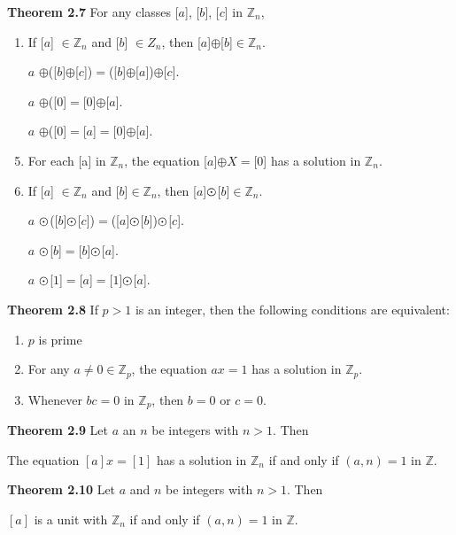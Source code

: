 \documentclass[12pt]{article}
\newcommand{\Z}{\mathbb{Z}}
\begin{document}
\noindent
\textbf{Theorem 2.7} For any classes [$a$], [$b$], [$c$] in $\Z_n$,
\begin{enumerate}
\item If [$a$] $\in \Z_n$ and [$b$] $\in Z_n$, then [$a$]$\oplus$[$b$]$\in \Z_n$. \\
\item [$a$]$\oplus$([$b$]$\oplus$[$c$])$=$([$b$]$\oplus$[$a$])$\oplus$[$c$]. \\
\item [$a$]$\oplus$([$0$]$=$[$0$]$\oplus$[$a$]. \\
\item [$a$]$\oplus$([$0$]$=$[$a$]$=$[$0$]$\oplus$[$a$]. \\
\item For each $[$a$]$ in $\Z_n$, the equation [$a$]$\oplus X=$[$0$] has a solution in $\Z_n$. \\
\item If [$a$] $\in \Z_n$ and [$b$]$\in \Z_n$, then [$a$]$\varodot$[$b$]$\in \Z_n$. \\
\item [$a$] $\varodot$([$b$]$\varodot$[$c$])$=$([$a$]$\varodot$[$b$])$\varodot$[$c$]. \\
\item  [$a$] $\varodot$[$b$]$=$[$b$]$\varodot$[$a$]. \\
\item [$a$] $\varodot$[$1$]$=$[$a$]$=$[$1$]$\varodot$[$a$].
\end{enumerate}

\noindent
\textbf{Theorem 2.8} If $p>1$ is an integer, then the following conditions are equivalent:
\begin{enumerate}
\item $p$ is prime
\item For any $a \neq 0 \in \Z_p$, the equation $ax=1$ has a solution in $\Z_p$.
\item Whenever $bc=0$ in $\Z_p$, then $b=0$ or $c=0$.
\end{enumerate}

\noindent
\textbf{Theorem 2.9} Let $a$ an $n$ be integers with $n>1$. Then
\begin{center}
The equation $[a]x=[1]$ has a solution in $\Z_n$ if and only if $(a,n)=1$ in $\Z$.
\end{center}

\noindent
\textbf{Theorem 2.10}
Let $a$ and $n$ be integers with $n>1$. Then
\begin{center}
$[a]$ is a unit with $\Z_n$ if and only if $(a,n)=1$ in $\Z$.
\end{center}
\end{document}
